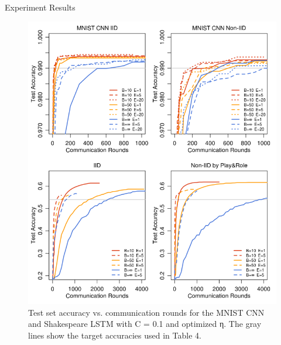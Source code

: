 \documentclass{beamer}
\begin{document}
\begin{frame}{Experiment Results}
	\begin{figure}[htbp]
		\begin{minipage}{0.6\textwidth}
			\centering
			\includegraphics[scale=0.4]{line1.png}
		\end{minipage}%
		\hfill
		\begin{minipage}{0.4\textwidth}
			\caption{Test set accuracy vs. communication rounds
				for the MNIST CNN and Shakespeare LSTM  with
				C = 0.1 and optimized η. The gray lines show the target
				accuracies used in Table 4. }
		\end{minipage}
	\end{figure}
\end{frame}
\end{document}
